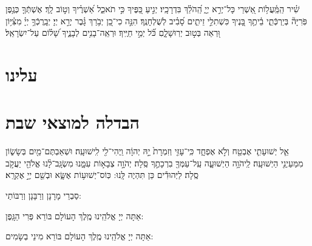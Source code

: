 \documentclass[twoside, openany, parskip=half, 11pt]{book}
\begin{document}
\sepline


שִׁ֗יר הַֽמַּֽ֫עֲל֥וֹת אַ֭שְׁרֵי כָּל־יְרֵ֣א יְיָ֑ הַֽ֝הֹלֵ֗ךְ בִּדְרָכָֽיו׃ 
	יְגִ֣יעַ כַּ֭פֶּיךָ כִּ֣י תֹאכֵ֑ל 	אַ֝שְׁרֶ֗יךָ וְט֣וֹב לָֽךְ׃ 
	אֶשְׁתְּֿךָ֤ כְּגֶ֥פֶן פֹּֽרִיָּה֘ בְּיַרְכְּֿתֵ֢י בֵ֫יתֶ֥ךָ 	בָּ֭נֶיךָ כִּשְׁתִלֵ֣י זֵיתִ֑ים 	סָ֝בִ֗יב לְשֻׁלְחָנֶֽךָ׃ 
הִנֵּ֣ה כִי־כֵ֭ן יְבֹ֥רַךְ גָּ֗בֶר יְרֵ֣א יְיָ׃ 
	יְבָֽרֶכְֿךָ֥ יְיָ֗ מִצִּ֫יּ֥וֹן וּ֭רְאֵה בְּט֣וּב יְרֽוּשָׁלָ֑םִ כֹּ֝֗ל יְמֵ֣י חַיֶּֽיךָ׃ 
וּרְאֵֽה־בָנִ֥ים לְבָנֶ֑יךָ 	שָׁ֝ל֗וֹם עַל־יִשְׂרָאֵֽל׃


\label{matzash_alienu}
\fullkaddish


\section*{ עלינו }


\aleinu

\vfill

\quad{}\quad{}

\clearpage 

\section[הבדלה]{ הבדלה למוצאי שבת } \label{havdala}


\birkashabonim

\sepline

אֵ֧ל יְשׁוּעָתִ֛י אֶבְטַ֖ח וְלֹ֣א אֶפְחָ֑ד כִּֽי־עָזִּ֤י וְזִמְרָת֙ יָ֣הּ יְהוָ֔ה וַֽיְהִי־לִ֖י לִֽישׁוּעָֽה׃
וּשְׁאַבְתֶּם־מַ֖יִם בְּשָׂשׂ֑וֹן מִמַּעַיְנֵ֖י הַיְשׁוּעָֽה׃
לַֽיהֹוָ֥ה הַיְשׁוּעָ֑ה עַֽל־עַמְּךָ֖ בִרְכָתֶ֣ךָ סֶּֽלָה׃ 
יְהֹוָ֣ה צְבָא֣וֹת עִמָּ֑נוּ מִשְׂגָּֽב־לָ֨נוּ אֱלֹהֵ֖י יַעֲקֹ֣ב סֶֽלָה׃
לַיְּהוּדִ֕ים  כֵּן תִּהְיֶה לָּֽנוּ: כּֽוֹס־יְשׁוּע֥וֹת אֶשָּׂ֑א וּבְשֵׁ֖ם יְיָ֣ אֶקְרָֽא׃


\begin{scriptsize}
סַבְרֵי מָרָנָן וְרַבָּנָן וְרַבּוֹתַי: \\
\end{scriptsize}
  אַתָּה יְיָ אֱלֹהֵֽינוּ מֶֽלֶךְ הָעוֹלָם בּוֹרֵא פְּרִי הַגָּֽפֶן:

   אַתָּה יְיָ אֱלֹהֵֽינוּ מֶֽלֶךְ הָעוֹלָם בּוֹרֵא מִינֵי בְשָׂמִים:
\end{document}
